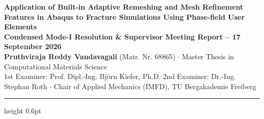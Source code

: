 \documentclass[10.5pt,a4paper]{article}
\begin{document}
\begin{center}
  {\Large\textbf{Application of Built-in Adaptive Remeshing and Mesh Refinement Features in Abaqus to Fracture Simulations Using Phase-field User Elements}}\\[0.3em]
  {\large\textbf{Condensed Mode-I Resolution \& Supervisor Meeting Report -- 17 September 2026}}\\[0.2em]
  {\normalsize\textbf{Pruthviraja Reddy Vandavagali} (Matr. Nr. 68865) \quad $\cdot$ \quad Master Thesis in Computational Materials Science}\\[0.15em]
  {\footnotesize 1st Examiner: Prof. Dipl.-Ing. Bj\"orn Kiefer, Ph.D. \quad 2nd Examiner: Dr.-Ing. Stephan Roth \quad $\cdot$ \quad Chair of Applied Mechanics (IMFD), TU Bergakademie Freiberg}
\end{center}
\vspace{-0.4em}
\hrule height 0.6pt
\vspace{0.4em}


\clearpage


\clearpage


\clearpage


\clearpage


\clearpage


\clearpage


\clearpage


\end{document}
